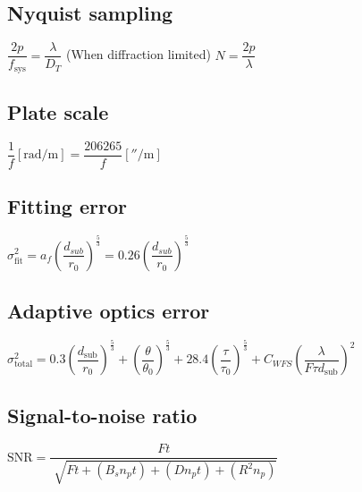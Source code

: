 \subsection{Nyquist sampling}		
\begin{itemize}
\itemt \( \dfrac{2p}{f_\mathrm{sys}} = \dfrac{\lambda}{D_T} \) \tab (When diffraction limited)
\itemt \( N = \dfrac{2p}{\lambda} \)
\end{itemize}			

\subsection{Plate scale}		
\begin{itemize}
\itemt \( \dfrac{1}{f} [\si{\radian/\metre}] = \dfrac{206265}{f} [\si{\arcsecond/\metre}] \)
\end{itemize}


\subsection{Fitting error}		
\begin{itemize}
\itemt \( \sigma_\mathrm{fit}^2 = a_f \left(\dfrac{d_{sub}}{r_0}\right)^{\frac{5}{3}} = 0.26 \left(\dfrac{d_{sub}}{r_0}\right)^{\frac{5}{3}} \)
\end{itemize}

\subsection{Adaptive optics error}
\begin{itemize}
\itemt \( \sigma_\mathrm{total}^2 = 0.3\left(\dfrac{d_\mathrm{sub}}{r_0}\right)^{\frac{5}{3}} + \left(\dfrac{\theta}{\theta_0}\right)^{\frac{5}{3}} + 28.4\left(\dfrac{\tau}{\tau_0}\right)^{\frac{5}{3}} + C_{WFS} \left(\dfrac{\lambda}{F\tau d_\mathrm{sub}}\right)^2 \)
\end{itemize}
		 
\subsection{Signal-to-noise ratio}
\begin{itemize}
\itemt \( \mathrm{SNR} = \dfrac{Ft}{\sqrt[]{Ft + (B_s n_p t) + (D n_p t) + (R^2 n_p)}} \)
\end{itemize}

